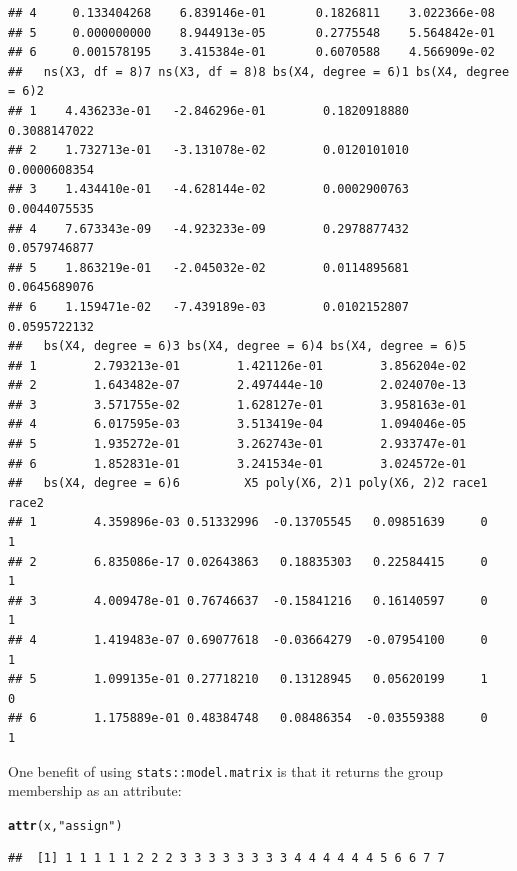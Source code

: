 \documentclass[12pt,letter]{article}\usepackage[]{graphicx}\usepackage[]{color}
\makeatletter
\newcommand{\hlstr}[1]{\textcolor[rgb]{0.192,0.494,0.8}{#1}}%
\newcommand{\hlstd}[1]{\textcolor[rgb]{0.345,0.345,0.345}{#1}}%
\newcommand{\hlkwd}[1]{\textcolor[rgb]{0.737,0.353,0.396}{\textbf{#1}}}%
\newenvironment{kframe}{%
 \def\at@end@of@kframe{}%
 \ifinner\ifhmode%
  \def\at@end@of@kframe{\end{minipage}}%
  \begin{minipage}{\columnwidth}%
 \fi\fi%
 \def\FrameCommand##1{\hskip\@totalleftmargin \hskip-\fboxsep
 \colorbox{shadecolor}{##1}\hskip-\fboxsep
     \hskip-\linewidth \hskip-\@totalleftmargin \hskip\columnwidth}%
 \MakeFramed {\advance\hsize-\width
   \@totalleftmargin\z@ \linewidth\hsize
   \@setminipage}}%
 {\par\unskip\endMakeFramed%
 \at@end@of@kframe}
\newenvironment{knitrout}{}{} %
\makeatother
\begin{document}
\begin{knitrout}
\begin{kframe}
\begin{verbatim}
## 4     0.133404268    6.839146e-01       0.1826811    3.022366e-08
## 5     0.000000000    8.944913e-05       0.2775548    5.564842e-01
## 6     0.001578195    3.415384e-01       0.6070588    4.566909e-02
##   ns(X3, df = 8)7 ns(X3, df = 8)8 bs(X4, degree = 6)1 bs(X4, degree = 6)2
## 1    4.436233e-01   -2.846296e-01        0.1820918880        0.3088147022
## 2    1.732713e-01   -3.131078e-02        0.0120101010        0.0000608354
## 3    1.434410e-01   -4.628144e-02        0.0002900763        0.0044075535
## 4    7.673343e-09   -4.923233e-09        0.2978877432        0.0579746877
## 5    1.863219e-01   -2.045032e-02        0.0114895681        0.0645689076
## 6    1.159471e-02   -7.439189e-03        0.0102152807        0.0595722132
##   bs(X4, degree = 6)3 bs(X4, degree = 6)4 bs(X4, degree = 6)5
## 1        2.793213e-01        1.421126e-01        3.856204e-02
## 2        1.643482e-07        2.497444e-10        2.024070e-13
## 3        3.571755e-02        1.628127e-01        3.958163e-01
## 4        6.017595e-03        3.513419e-04        1.094046e-05
## 5        1.935272e-01        3.262743e-01        2.933747e-01
## 6        1.852831e-01        3.241534e-01        3.024572e-01
##   bs(X4, degree = 6)6         X5 poly(X6, 2)1 poly(X6, 2)2 race1 race2
## 1        4.359896e-03 0.51332996  -0.13705545   0.09851639     0     1
## 2        6.835086e-17 0.02643863   0.18835303   0.22584415     0     1
## 3        4.009478e-01 0.76746637  -0.15841216   0.16140597     0     1
## 4        1.419483e-07 0.69077618  -0.03664279  -0.07954100     0     1
## 5        1.099135e-01 0.27718210   0.13128945   0.05620199     1     0
## 6        1.175889e-01 0.48384748   0.08486354  -0.03559388     0     1
\end{verbatim}
\end{kframe}
\end{knitrout}

One benefit of using \texttt{stats::model.matrix} is that it returns the group membership as an attribute:

\begin{knitrout}\scriptsize
{}\color{fgcolor}\begin{kframe}
\begin{alltt}
\hlkwd{attr}\hlstd{(x,} \hlstr{"assign"}\hlstd{)}
\end{alltt}
\begin{verbatim}
##  [1] 1 1 1 1 1 2 2 2 3 3 3 3 3 3 3 3 4 4 4 4 4 4 5 6 6 7 7
\end{verbatim}
\end{kframe}
\end{knitrout}
\end{document}
